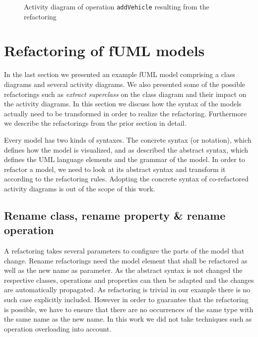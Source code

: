 \documentclass{llncs}
\begin{document}
\begin{figure}[h!t]
 \centering
 \caption{Activity diagram of operation \texttt{addVehicle} resulting from the refactoring}
 \label{fig:addCarRef}
\end{figure}

\clearpage
\section{Refactoring of fUML models}
\label{sec:fuml-refactoring}

In the last section we presented an example fUML model comprising a class diagrams and several activity diagrams. We also presented some of the possible 
refactorings such as \textit{extract superclass} on the class diagram and their impact on the activity diagrams. In this 
section we discuss how the syntax of the models actually need to be transformed in order to realize the refactoring. Furthermore we describe 
the refactorings from the prior section in detail.

Every model has two kinds of syntaxes. The concrete syntax (or notation), which defines how the model is visualized, and as described the abstract
syntax, which defines the UML language elements and the grammar of the model. In order to refactor a model, we need to look 
at its abstract syntax and transform it according to the refactoring rules. Adopting the concrete syntax of co-refactored activity diagrams 
is out of the scope of this work.

\subsection{Rename class, rename property \& rename operation}
\label{sec:renames}
A refactoring takes several parameters to configure the parts of the model that change. Rename 
refactorings need the model element that shall be refactored as well as the new name as parameter. As the abstract syntax 
is not changed the respective classes, operations and properties can then be adapted 
and the changes are automatically propagated. As refactoring is trivial in our example there is no such case explicitly 
included. However in order to guarantee that the 
refactoring is possible, we have to ensure that there are no occurrences of the same type with the same name as the 
new name. In this work we did not take techniques such as operation overloading into account.
\end{document}
